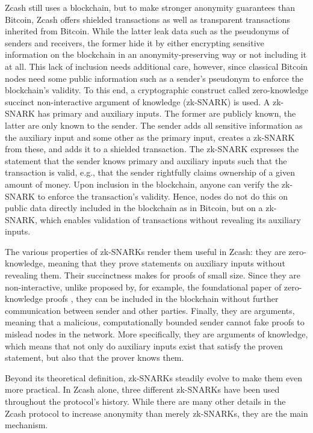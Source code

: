 \documentclass{article}
\begin{document}
Zcash still uses a blockchain, but to make stronger anonymity guarantees than Bitcoin, Zcash offers shielded transactions as well as transparent transactions inherited from Bitcoin.
While the latter leak data such as the pseudonyms of senders and receivers, the former hide it by either encrypting sensitive information on the blockchain in an anonymity-preserving way or not including it at all.
This lack of inclusion needs additional care, however, since classical Bitcoin nodes need some public information such as a sender's pseudonym to enforce the blockchain's validity.
To this end, a cryptographic construct called zero-knowledge succinct non-interactive argument of knowledge (zk-SNARK) is used.
A zk-SNARK has primary and auxiliary inputs.
The former are publicly known, the latter are only known to the sender.
The sender adds all sensitive information as the auxiliary input and some other as the primary input, creates a zk-SNARK from these, and adds it to a shielded transaction.
The zk-SNARK expresses the statement that the sender knows primary and auxiliary inputs such that the transaction is valid, e.g., that the sender rightfully claims ownership of a given amount of money.
Upon inclusion in the blockchain, anyone can verify the zk-SNARK to enforce the transaction's validity.
Hence, nodes do not do this on public data directly included in the blockchain as in Bitcoin, but on a zk-SNARK, which enables validation of transactions without revealing its auxiliary inputs.

The various properties of zk-SNARKs render them useful in Zcash: they are zero-knowledge, meaning that they prove statements on auxiliary inputs without revealing them.
Their succinctness makes for proofs of small size.
Since they are non-interactive, unlike proposed by, for example, the foundational paper of zero-knowledge proofs \cite{goldwasser:zk}, they can be included in the blockchain without further communication between sender and other parties.
Finally, they are arguments, meaning that a malicious, computationally bounded sender cannot fake proofs to mislead nodes in the network.
More specifically, they are arguments of knowledge, which means that not only do auxiliary inputs exist that satisfy the proven statement, but also that the prover knows them.

Beyond its theoretical definition, zk-SNARKs steadily evolve to make them even more practical.
In Zcash alone, three different zk-SNARKs \cite{bensasson:zksnark} \cite{groth:zksnark} \cite{hopwood:zcash} have been used throughout the protocol's history.
While there are many other details in the Zcash protocol to increase anonymity than merely zk-SNARKs, they are the main mechanism.
\end{document}
